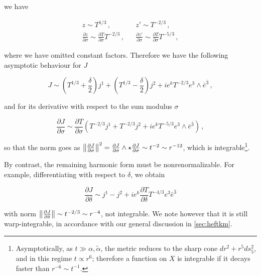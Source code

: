 we have

\begin{align}
	z \sim T^{1/3}\,, && z' \sim T^{-2/3}\,,\\	
	\frac{\partial z}{\partial \sigma} \sim \frac{\partial T}{\partial \sigma} T^{-2/3}\,, && \frac{\partial z'}{\partial \sigma} \sim \frac{\partial T}{\partial \sigma} T^{-5/3}\,,
\end{align}

where we have omitted constant factors. Therefore we have the following asymptotic behaviour for $J$

\begin{equation}
	J \sim \left(T^{1/3} + \frac{\delta}{2}\right) j^1 + \left(T^{1/3} - \frac{\delta}{2}\right)j^2 + ie^k T^{-2/3} e^3 \wedge \bar e^{\bar 3}\,,
	\label{}
\end{equation}

and for its derivative with respect to the sum modulus $\sigma$

\begin{equation}
	\frac{\partial J}{\partial \sigma} \sim \frac{\partial T}{\partial \sigma}\left( T^{-2/3} j^1 + T^{-2/3} j^2 + i e^k T^{-5/3}e^3 \wedge \bar e^{\bar 3} \right)\,,
	\label{}
\end{equation}


so that the norm goes as $\left\Vert \frac{\partial J}{\partial\sigma} \right\Vert^2 = \frac{\partial J}{\partial\sigma} \wedge \star \frac{\partial J}{\partial\sigma} \sim t^{-2} \sim r^{-12}$, which is integrable\footnote{Asymptotically, as $t\gg \alpha,\tilde{\alpha}$, the metric reduces to the sharp cone $dr^2 + r^5 ds_5^2$, and in this regime $t \propto r^6$; therefore a function on $X$ is integrable if it decays faster than $r^{-6} \sim t^{-1}$.}.

By contrast, the remaining harmonic form must be nonrenormalizable. For example, differentiating with respect to $\delta$, we obtain

\begin{equation}
	\frac{\partial J}{\partial \delta} \sim j^1 - j^2 + ie^k \frac{\partial T}{\partial \delta} T^{-4/3} e^3 \bar e^{\bar 3}
	\label{}
\end{equation}

with norm $ \left\Vert \frac{\partial J}{\partial\delta} \right\Vert \sim t^{-2/3} \sim r^{-4}$, not integrable. We note however that it is still warp-integrable, in accordance with our general discussion in \ref{sec:heftkm}.

